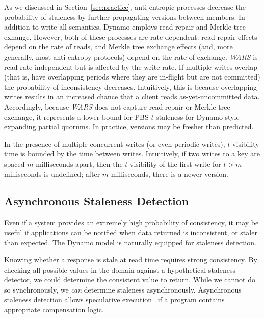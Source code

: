 \documentclass{vldb}
\begin{document}
As we discussed in Section~\ref{sec:practice}, anti-entropic processes
decrease the probability of staleness by further propagating versions
between members.  In addition to write-all semantics, Dynamo employs
read repair and Merkle tree exhange. However, both of these processes
are rate dependent: read repair effects depend on the rate of reads,
and Merkle tree exchange effects (and, more generally, most
anti-entropy protocols) depend on the rate of exchange.  \textit{WARS}
is read rate independent but is affected by the write rate.  If
multiple writes overlap (that is, have overlapping periods where they
are in-flight but are not committed) the probability of inconsistency
decreases.  Intuitively, this is because overlapping writes results in an
increased chance that a client reads as-yet-uncommitted data.
Accordingly, because \textit{WARS} does not capture read repair or
Merkle tree exchange, it represents a lower bound for PBS
$t$-staleness for Dynamo-style expanding partial quorums. In practice,
versions may be fresher than predicted.

In the presence of multiple concurrent writes (or even periodic
writes), $t$-visibility time is bounded by the time between writes.
Intuitively, if two writes to a key are spaced $m$ milliseconds apart,
then the $t$-visibility of the first write for $t > m$ milliseconds is
undefined; after $m$ milliseconds, there is a newer version.

\subsection{Asynchronous Staleness Detection}

Even if a system provides an extremely high probability of
consistency, it  may be useful if applications can be notified when
data returned is inconsistent, or staler than expected.  The Dynamo
model is naturally equipped for staleness detection.

Knowing whether a response is stale at read time requires strong
consistency.  By checking all possible values in the domain against a
hypothetical staleness detector, we could determine the consistent
value to return.  While we cannot do so synchronously, we \textit{can}
determine staleness asynchronously.  Asynchronous staleness detection
allows speculative execution~\cite{nsdispeculation} if a program
contains appropriate compensation logic.
\end{document}
